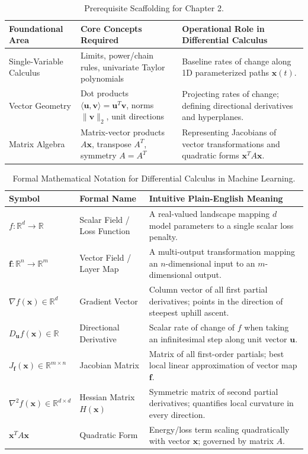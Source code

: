 \begin{table}[htbp]
\centering
\small
\begin{tabularx}{\textwidth}{lXX}
\toprule
\textbf{Foundational Area} & \textbf{Core Concepts Required} & \textbf{Operational Role in Differential Calculus} \\
\midrule
Single-Variable Calculus & Limits, power/chain rules, univariate Taylor polynomials & Baseline rates of change along 1D parameterized paths $\mathbf{x}(t)$. \\
\addlinespace
Vector Geometry & Dot products $\langle \mathbf{u}, \mathbf{v} \rangle = \mathbf{u}^T \mathbf{v}$, norms $\|\mathbf{v}\|_2$, unit directions & Projecting rates of change; defining directional derivatives and hyperplanes. \\
\addlinespace
Matrix Algebra & Matrix-vector products $A\mathbf{x}$, transpose $A^T$, symmetry $A = A^T$ & Representing Jacobians of vector transformations and quadratic forms $\mathbf{x}^T A \mathbf{x}$. \\
\bottomrule
\end{tabularx}
\caption{Prerequisite Scaffolding for Chapter 2.}
\label{tab:w02_prereqs}
\end{table}

\begin{table}[htbp]
\centering
\small
\begin{tabularx}{\textwidth}{llX}
\toprule
\textbf{Symbol} & \textbf{Formal Name} & \textbf{Intuitive Plain-English Meaning} \\
\midrule
$f: \mathbb{R}^d \to \mathbb{R}$ & Scalar Field / Loss Function & A real-valued landscape mapping $d$ model parameters to a single scalar loss penalty. \\
$\mathbf{f}: \mathbb{R}^n \to \mathbb{R}^m$ & Vector Field / Layer Map & A multi-output transformation mapping an $n$-dimensional input to an $m$-dimensional output. \\
$\nabla f(\mathbf{x}) \in \mathbb{R}^d$ & Gradient Vector & Column vector of all first partial derivatives; points in the direction of steepest uphill ascent. \\
$D_{\mathbf{u}} f(\mathbf{x}) \in \mathbb{R}$ & Directional Derivative & Scalar rate of change of $f$ when taking an infinitesimal step along unit vector $\mathbf{u}$. \\
$J_{\mathbf{f}}(\mathbf{x}) \in \mathbb{R}^{m \times n}$ & Jacobian Matrix & Matrix of all first-order partials; best local linear approximation of vector map $\mathbf{f}$. \\
$\nabla^2 f(\mathbf{x}) \in \mathbb{R}^{d \times d}$ & Hessian Matrix $H(\mathbf{x})$ & Symmetric matrix of second partial derivatives; quantifies local curvature in every direction. \\
$\mathbf{x}^T A \mathbf{x}$ & Quadratic Form & Energy/loss term scaling quadratically with vector $\mathbf{x}$; governed by matrix $A$. \\
\bottomrule
\end{tabularx}
\caption{Formal Mathematical Notation for Differential Calculus in Machine Learning.}
\label{tab:w02_notation}
\end{table}

